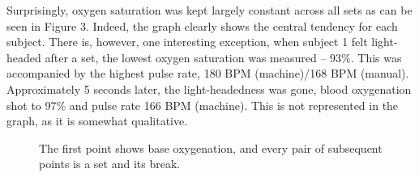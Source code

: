 Surprisingly, oxygen saturation was kept largely constant across all sets as can be seen in Figure 3. Indeed, the graph clearly shows the central tendency for each subject.
There is, however, one interesting exception, when subject 1 felt light-headed after a set, the lowest oxygen saturation was measured – 93\%.
This was accompanied by the highest pulse rate, 180 BPM (machine)/168 BPM (manual).
Approximately 5 seconds later, the light-headedness was gone, blood oxygenation shot to 97\% and pulse rate 166 BPM (machine).
This is not represented in the graph, as it is somewhat qualitative.
\begin{figure}[h]
    \centering
    \caption{The first point shows base oxygenation, and every pair of subsequent points is a set and its break.}
    \label{fig:BloodOxygenation}
\end{figure}